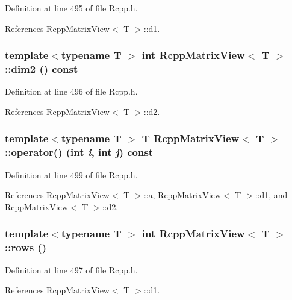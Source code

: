 Definition at line 495 of file Rcpp.h.

References RcppMatrixView$<$ T $>$::d1.\hypertarget{classRcppMatrixView_aebb7f65646ce780c897dc39f31899439}{
\subsubsection[{dim2}]{\setlength{\rightskip}{0pt plus 5cm}template$<$typename T $>$ int {\bf RcppMatrixView}$<$ T $>$::dim2 () const}}
\label{classRcppMatrixView_aebb7f65646ce780c897dc39f31899439}


Definition at line 496 of file Rcpp.h.

References RcppMatrixView$<$ T $>$::d2.\hypertarget{classRcppMatrixView_ad135a7e855eee55b078807766aff9e96}{
\subsubsection[{operator()}]{\setlength{\rightskip}{0pt plus 5cm}template$<$typename T $>$ T {\bf RcppMatrixView}$<$ T $>$::operator() (int {\em i}, \/  int {\em j}) const}}
\label{classRcppMatrixView_ad135a7e855eee55b078807766aff9e96}


Definition at line 499 of file Rcpp.h.

References RcppMatrixView$<$ T $>$::a, RcppMatrixView$<$ T $>$::d1, and RcppMatrixView$<$ T $>$::d2.\hypertarget{classRcppMatrixView_a0892184e9fc01863f79d76b3751ddbdb}{
\subsubsection[{rows}]{\setlength{\rightskip}{0pt plus 5cm}template$<$typename T $>$ int {\bf RcppMatrixView}$<$ T $>$::rows ()}}
\label{classRcppMatrixView_a0892184e9fc01863f79d76b3751ddbdb}


Definition at line 497 of file Rcpp.h.

References RcppMatrixView$<$ T $>$::d1.

